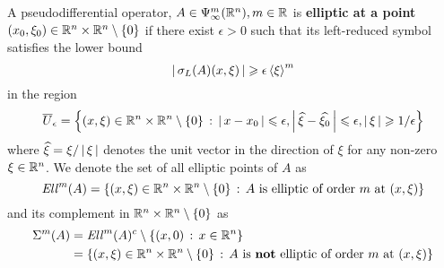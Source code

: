 \documentclass[12pt]{article}
\begin{document}
\begin{fdefinition}
    A pseudodifferential operator, $A \in \Psi^m_\infty(\R^n), m \in \R$ is \textbf{elliptic at a point} $(x_0, \xi_0) \in \R^n \times \R^n \setminus \set{0}$ if there exist $\epsilon > 0$ such that its left-reduced symbol satisfies the lower bound
    \[
    \abs{\sigma_L(A)(x, \xi)} \geq \epsilon \sym[\xi]^m
    \]
    in the region
    \[
    \overline{U}_\epsilon = \set{(x, \xi) \in \R^n \times \R^n \setminus \set{0} \wh \abs{x - x_0} \leq \epsilon, \abs{\widehat{\xi} - \widehat{\xi_0}} \leq \epsilon, \abs{\xi} \geq 1/\epsilon}
    \]
    where $\widehat{\xi} = \xi / \abs{\xi}$ denotes the unit vector in the direction of $\xi$ for any non-zero $\xi \in \R^n$. We denote the set of all elliptic points of $A$ as 
    \[
    \Ell^m(A) = \set{(x, \xi) \in \R^n \times \R^n \setminus \set{0} \wh A \text{  is elliptic of order $m$ at } (x, \xi)}
    \]
    and its complement in $\R^n \times \R^n \setminus \set{0}$ as 
    \begin{align*}
        \Char^m(A) 
        &= \Ell^m(A)^c \setminus \set{(x, 0)\wh x \in \R^n} \\
        &= \set{(x, \xi) \in \R^n \times \R^n \setminus \set{0} \wh A \text{  is \textbf{not} elliptic of order $m$ at } (x, \xi)}
    \end{align*}
\end{fdefinition}
\end{document}

